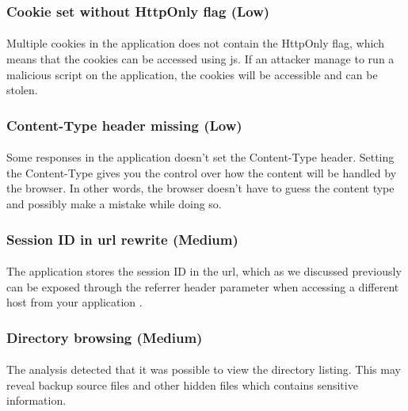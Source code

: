 \documentclass[11pt,english,a4paper]{report}
\begin{document}
\subsubsection{Cookie set without HttpOnly flag (Low)}
\paragraph{}
Multiple cookies in the application does not contain the HttpOnly flag, which means that the cookies can be accessed using \gls{js}.
If an attacker manage to run a malicious script on the application, the cookies will be accessible and can be stolen.

\subsubsection{Content-Type header missing (Low)}
\paragraph{}
Some responses in the application doesn't set the Content-Type header.
Setting the Content-Type gives you the control over how the content will be handled by the browser.
In other words, the browser doesn't have to guess the content type and possibly make a mistake while doing so.

\subsubsection{Session ID in \gls{url} rewrite (Medium)}
\paragraph{}
The application stores the session ID in the \gls{url}, which as we discussed previously can be exposed through the referrer header parameter when accessing a different host from your application \cite{url-sessionid-risks}.

\subsubsection{Directory browsing (Medium)}
\paragraph{}
The analysis detected that it was possible to view the directory listing.
This may reveal backup source files and other hidden files which contains sensitive information.
\end{document}
